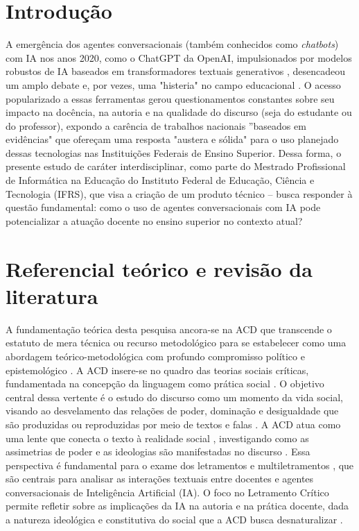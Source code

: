 \documentclass[portuguese]{textolivre}
\begin{document}
\section{Introdução}\label{sec-intro}
A emergência dos agentes conversacionais (também conhecidos como \textit{chatbots}) com IA nos anos 2020, como o ChatGPT da OpenAI, impulsionados por modelos robustos de IA baseados em transformadores textuais generativos \cite{bochie2020aprendizado}, desencadeou um amplo debate e, por vezes, uma "histeria" no campo educacional \cite{selwyn2024limits}. O acesso popularizado a essas ferramentas gerou questionamentos constantes sobre seu impacto na docência, na autoria e na qualidade do discurso (seja do estudante ou do professor), expondo a carência de trabalhos nacionais ''baseados em evidências" que ofereçam uma resposta "austera e sólida" para o uso planejado dessas tecnologias nas Instituições Federais de Ensino Superior. Dessa forma, o presente estudo de caráter interdisciplinar, como parte do Mestrado Profissional de Informática na Educação do Instituto Federal de Educação, Ciência e Tecnologia (IFRS), que visa a criação de um produto técnico – busca responder à questão fundamental: como o uso de agentes conversacionais com IA pode potencializar a atuação docente no ensino superior no contexto atual?

\section{Referencial teórico e revisão da literatura}\label{sec-normas}
A fundamentação teórica desta pesquisa ancora-se na ACD que transcende o estatuto de mera técnica ou recurso metodológico \cite{silva2017analise} para se estabelecer como uma abordagem teórico-metodológica com profundo compromisso político e epistemológico \cite{mesquita2020analise}. A ACD insere-se no quadro das teorias sociais críticas, fundamentada na concepção da linguagem como prática social \cite{fairclough1989language,fairclough2001discourse}. O objetivo central dessa vertente é o estudo do discurso como um momento da vida social, visando ao desvelamento das relações de poder, dominação e desigualdade que são produzidas ou reproduzidas por meio de textos e falas \cite{vandijk2001critical}. A ACD atua como uma lente que conecta o texto à realidade social \cite{fairclough2006language}, investigando como as assimetrias de poder e as ideologias são manifestadas no discurso \cite{chouliaraki1999discourse}. Essa perspectiva é fundamental para o exame dos letramentos e multiletramentos \cite{rojo2012pedagogia}, que são centrais para analisar as interações textuais entre docentes e agentes conversacionais de Inteligência Artificial (IA). O foco no Letramento Crítico \cite{janks2010literacy,janks2012importance} permite refletir sobre as implicações da IA na autoria e na prática docente, dada a natureza ideológica e constitutiva do social que a ACD busca desnaturalizar \cite{wodak2009methods}.
\end{document}
